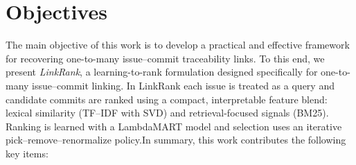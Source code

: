 \section{Objectives}

The main objective of this work is to develop a practical and effective framework for recovering one-to-many issue--commit traceability links. To this end, we present \emph{LinkRank}, a learning-to-rank formulation designed specifically for one-to-many issue--commit linking. In LinkRank each issue is treated as a query and candidate commits are ranked using a compact, interpretable feature blend: lexical similarity (TF--IDF with SVD) and retrieval-focused signals (BM25). Ranking is learned with a LambdaMART model and selection uses an iterative pick--remove--renormalize policy.In summary, this work contributes the following key items:

